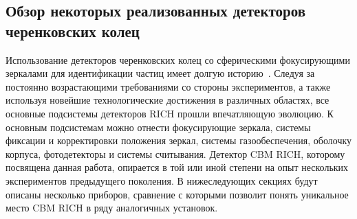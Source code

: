 

\subsection{Обзор некоторых реализованных детекторов черенковских колец}\label{sec:secRiches}

Использование детекторов черенковских колец со сферическими фокусирующими зеркалами для идентификации частиц имеет долгую историю~\cite{RichHistory}. Следуя за постоянно возрастающими требованиями со стороны экспериментов, а также используя новейшие технологические достижения в различных областях, все основные подсистемы детекторов RICH прошли впечатляющую эволюцию. К основным подсистемам можно отнести фокусирующие зеркала, системы фиксации и корректировки положения зеркал, системы газообеспечения, оболочку корпуса, фотодетекторы и системы считывания. Детектор CBM RICH, которому посвящена данная работа, опирается в той или иной степени на опыт нескольких экспериментов предыдущего поколения. В нижеследующих секциях будут описаны несколько приборов, сравнение с которыми позволит понять уникальное место CBM RICH в ряду аналогичных установок.


